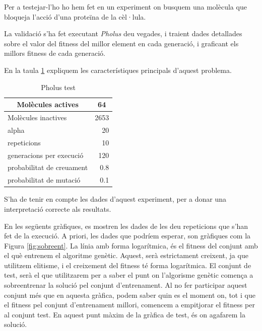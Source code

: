 Per a testejar-l'ho ho hem fet en un experiment on busquem una molècula que
bloqueja l'acció d'una proteïna de la cèl·lula.

La validació s'ha fet executant \emph{Pholus} deu vegades, i traient
dades detallades sobre el valor del fitness del millor element en cada
generació, i graficant els millors fitness de cada generació.

En la taula \ref{qrpholustest} expliquem les característiques principals d'aquest problema.


\begin{table}
\centering
\begin{tabular}{|l|r|}
\hline
\multicolumn{1}{|c|}{\textbf{Molècules actives }} & \multicolumn{1}{c|}{\textbf{ 64}} \\
\hline
\hline
Molècules inactives      & 2653 \\
alpha                     & 20   \\
repeticions               & 10   \\
generacions per execució & 120  \\
probabilitat de creuament & 0.8  \\
probabilitat de mutació  & 0.1  \\
\hline
\end{tabular}
\caption{Pholus test} \label{qrpholustest}
\end{table}

S'ha de tenir en compte les dades d'aquest experiment, per a donar una
interpretació correcte als resultats.

En les següents gràfiques, es mostren les dades de les deu repeticions que s'han
fet de la execució.  A priori, les dades que podríem esperar, son gràfiques com
la Figura \ref{fig:sobreent}.  La línia amb forma logarítmica, és
el fitness del conjunt amb el què entrenem el algoritme genètic.  Aquest, serà
estrictament creixent, ja que utilitzem elitisme, i el creixement del fitness té
forma logarítmica.  El conjunt de test, serà el que utilitzarem per a saber el
punt on l'algorisme genètic comença a sobreentrenar la solució pel conjunt
d'entrenament.  Al no fer participar aquest conjunt més que en aquesta gràfica, podem
saber quin es el moment on, tot i que el fitness pel conjunt d'entrenament millori,
comencem a empitjorar el fitness per al conjunt test.  En aquest punt màxim de
la gràfica de test, és on agafarem la solució.

